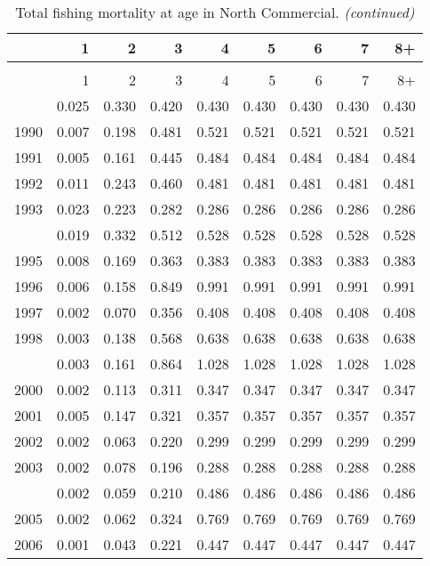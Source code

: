 \documentclass[
]{article}
\begin{document}
\begin{longtable}[t]{lrrrrrrrr}
\caption{\label{tab:North_Commercial-fleet-FAA-table}Total fishing mortality at age in North Commercial.}\\
\toprule
  & 1 & 2 & 3 & 4 & 5 & 6 & 7 & 8+\\
\midrule
\endfirsthead
\caption[]{Total fishing mortality at age in North Commercial. \textit{(continued)}}\\
\toprule
  & 1 & 2 & 3 & 4 & 5 & 6 & 7 & 8+\\
\midrule
\endhead

\endfoot
\bottomrule
\endlastfoot
1989 & 0.025 & 0.330 & 0.420 & 0.430 & 0.430 & 0.430 & 0.430 & 0.430\\
1990 & 0.007 & 0.198 & 0.481 & 0.521 & 0.521 & 0.521 & 0.521 & 0.521\\
1991 & 0.005 & 0.161 & 0.445 & 0.484 & 0.484 & 0.484 & 0.484 & 0.484\\
1992 & 0.011 & 0.243 & 0.460 & 0.481 & 0.481 & 0.481 & 0.481 & 0.481\\
1993 & 0.023 & 0.223 & 0.282 & 0.286 & 0.286 & 0.286 & 0.286 & 0.286\\
\addlinespace
1994 & 0.019 & 0.332 & 0.512 & 0.528 & 0.528 & 0.528 & 0.528 & 0.528\\
1995 & 0.008 & 0.169 & 0.363 & 0.383 & 0.383 & 0.383 & 0.383 & 0.383\\
1996 & 0.006 & 0.158 & 0.849 & 0.991 & 0.991 & 0.991 & 0.991 & 0.991\\
1997 & 0.002 & 0.070 & 0.356 & 0.408 & 0.408 & 0.408 & 0.408 & 0.408\\
1998 & 0.003 & 0.138 & 0.568 & 0.638 & 0.638 & 0.638 & 0.638 & 0.638\\
\addlinespace
1999 & 0.003 & 0.161 & 0.864 & 1.028 & 1.028 & 1.028 & 1.028 & 1.028\\
2000 & 0.002 & 0.113 & 0.311 & 0.347 & 0.347 & 0.347 & 0.347 & 0.347\\
2001 & 0.005 & 0.147 & 0.321 & 0.357 & 0.357 & 0.357 & 0.357 & 0.357\\
2002 & 0.002 & 0.063 & 0.220 & 0.299 & 0.299 & 0.299 & 0.299 & 0.299\\
2003 & 0.002 & 0.078 & 0.196 & 0.288 & 0.288 & 0.288 & 0.288 & 0.288\\
\addlinespace
2004 & 0.002 & 0.059 & 0.210 & 0.486 & 0.486 & 0.486 & 0.486 & 0.486\\
2005 & 0.002 & 0.062 & 0.324 & 0.769 & 0.769 & 0.769 & 0.769 & 0.769\\
2006 & 0.001 & 0.043 & 0.221 & 0.447 & 0.447 & 0.447 & 0.447 & 0.447\\

\end{longtable}
\end{document}
